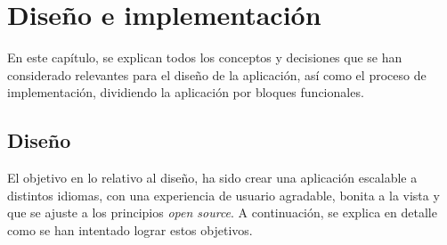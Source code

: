 \chapter{Diseño e implementación}
\label{cap:disenoEImpl}
En este capítulo, se explican todos los conceptos y decisiones que se han considerado relevantes para el diseño de la aplicación, así como el proceso de implementación, dividiendo la aplicación por bloques funcionales.

\section{Diseño}
El objetivo en lo relativo al diseño, ha sido crear una aplicación escalable a distintos idiomas, con una experiencia de usuario agradable, bonita a la vista y que se ajuste a los principios \textit{open source}. A continuación, se explica en detalle como se han intentado lograr estos objetivos.

